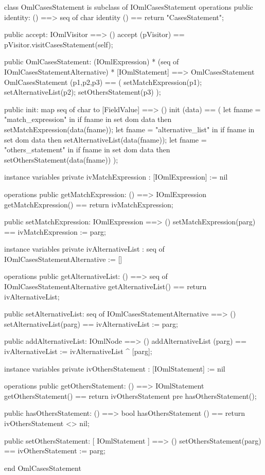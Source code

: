 \begin{vdm_al}
class OmlCasesStatement is subclass of IOmlCasesStatement
operations
  public identity: () ==> seq of char
  identity () == return "CasesStatement";

  public accept: IOmlVisitor ==> ()
  accept (pVisitor) == pVisitor.visitCasesStatement(self);

  public OmlCasesStatement:
      (IOmlExpression) *
      (seq of IOmlCasesStatementAlternative) *
      [IOmlStatement] ==> OmlCasesStatement
  OmlCasesStatement (p1,p2,p3) == 
   ( setMatchExpression(p1);
     setAlternativeList(p2);
     setOthersStatement(p3) );

  public init: map seq of char to [FieldValue] ==> ()
  init (data) ==
    ( let fname = "match_expression" in
        if fname in set dom data
        then setMatchExpression(data(fname));
      let fname = "alternative_list" in
        if fname in set dom data
        then setAlternativeList(data(fname));
      let fname = "others_statement" in
        if fname in set dom data
        then setOthersStatement(data(fname)) );

instance variables
  private ivMatchExpression : [IOmlExpression] := nil

operations
  public getMatchExpression: () ==> IOmlExpression
  getMatchExpression() == return ivMatchExpression;

  public setMatchExpression: IOmlExpression ==> ()
  setMatchExpression(parg) == ivMatchExpression := parg;

instance variables
  private ivAlternativeList : seq of IOmlCasesStatementAlternative := []

operations
  public getAlternativeList: () ==> seq of IOmlCasesStatementAlternative
  getAlternativeList() == return ivAlternativeList;

  public setAlternativeList: seq of IOmlCasesStatementAlternative ==> ()
  setAlternativeList(parg) == ivAlternativeList := parg;

  public addAlternativeList: IOmlNode ==> ()
  addAlternativeList (parg) == ivAlternativeList := ivAlternativeList ^ [parg];

instance variables
  private ivOthersStatement : [IOmlStatement] := nil

operations
  public getOthersStatement: () ==> IOmlStatement
  getOthersStatement() == return ivOthersStatement
    pre hasOthersStatement();

  public hasOthersStatement: () ==> bool
  hasOthersStatement () == return ivOthersStatement <> nil;

  public setOthersStatement: [ IOmlStatement ] ==> ()
  setOthersStatement(parg) == ivOthersStatement := parg;

end OmlCasesStatement
\end{vdm_al}

